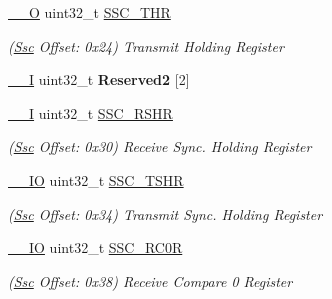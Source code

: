 \begin{DoxyCompactItemize}
\mbox{\label{structSsc_a3feb3405d8e8dd362ee0664797271b80}} 
\mbox{\hyperlink{core__cm7_8h_a7e25d9380f9ef903923964322e71f2f6}{\+\_\+\+\_\+O}} uint32\+\_\+t \mbox{\hyperlink{structSsc_a3feb3405d8e8dd362ee0664797271b80}{S\+S\+C\+\_\+\+T\+HR}}
\begin{DoxyCompactList}\small\item\em (\mbox{\hyperlink{structSsc}{Ssc}} Offset\+: 0x24) Transmit Holding Register \end{DoxyCompactList}\item 
\mbox{\label{structSsc_a9786e5e80cd6bddd0872ff18a6d83926}} 
\mbox{\hyperlink{core__cm7_8h_af63697ed9952cc71e1225efe205f6cd3}{\+\_\+\+\_\+I}} uint32\+\_\+t {\bfseries Reserved2} \mbox{[}2\mbox{]}
\item 
\mbox{\label{structSsc_a151c552116441e04803fa485684190c0}} 
\mbox{\hyperlink{core__cm7_8h_af63697ed9952cc71e1225efe205f6cd3}{\+\_\+\+\_\+I}} uint32\+\_\+t \mbox{\hyperlink{structSsc_a151c552116441e04803fa485684190c0}{S\+S\+C\+\_\+\+R\+S\+HR}}
\begin{DoxyCompactList}\small\item\em (\mbox{\hyperlink{structSsc}{Ssc}} Offset\+: 0x30) Receive Sync. Holding Register \end{DoxyCompactList}\item 
\mbox{\label{structSsc_a68cc6d35597beda980c50197d8268019}} 
\mbox{\hyperlink{core__cm7_8h_aec43007d9998a0a0e01faede4133d6be}{\+\_\+\+\_\+\+IO}} uint32\+\_\+t \mbox{\hyperlink{structSsc_a68cc6d35597beda980c50197d8268019}{S\+S\+C\+\_\+\+T\+S\+HR}}
\begin{DoxyCompactList}\small\item\em (\mbox{\hyperlink{structSsc}{Ssc}} Offset\+: 0x34) Transmit Sync. Holding Register \end{DoxyCompactList}\item 
\mbox{\label{structSsc_ab4809f5d5aac8507c5c7e185a19f9160}} 
\mbox{\hyperlink{core__cm7_8h_aec43007d9998a0a0e01faede4133d6be}{\+\_\+\+\_\+\+IO}} uint32\+\_\+t \mbox{\hyperlink{structSsc_ab4809f5d5aac8507c5c7e185a19f9160}{S\+S\+C\+\_\+\+R\+C0R}}
\begin{DoxyCompactList}\small\item\em (\mbox{\hyperlink{structSsc}{Ssc}} Offset\+: 0x38) Receive Compare 0 Register \end{DoxyCompactList}\item 

\end{DoxyCompactItemize}
